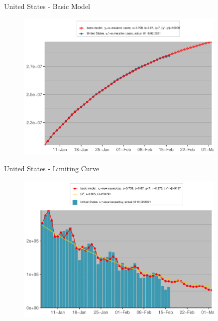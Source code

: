 \documentclass{beamer}
\begin{document}
\begin{frame}{United States - Basic Model}
\begin{figure}
\includegraphics[width=0.9\textwidth]{Plots/United States-baseyn.pdf}
\end{figure}
\end{frame}

\begin{frame}{United States - Limiting Curve}
\begin{figure}
\includegraphics[width=0.9\textwidth]{Plots/United States-Crn.pdf}
\end{figure}
\end{frame}
\end{document}
